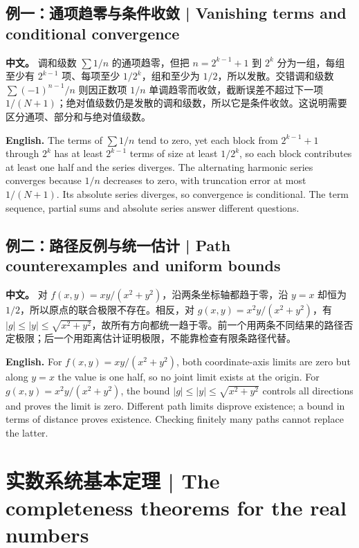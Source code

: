 \documentclass[UTF8,11pt,a4paper]{ctexart}
\newcommand{\APS}[2]{\par\noindent\textbf{中文。} #1\par\noindent\textbf{English.} #2\par\smallskip}
\begin{document}
\subsection*{例一：通项趋零与条件收敛 | Vanishing terms and conditional convergence}
\APS{调和级数 $\sum 1/n$ 的通项趋零，但把 $n=2^{k-1}+1$ 到 $2^k$ 分为一组，每组至少有 $2^{k-1}$ 项、每项至少 $1/2^k$，组和至少为 $1/2$，所以发散。交错调和级数 $\sum(-1)^{n-1}/n$ 则因正数项 $1/n$ 单调趋零而收敛，截断误差不超过下一项 $1/(N+1)$；绝对值级数仍是发散的调和级数，所以它是条件收敛。这说明需要区分通项、部分和与绝对值级数。}{The terms of $\sum1/n$ tend to zero, yet each block from $2^{k-1}+1$ through $2^k$ has at least $2^{k-1}$ terms of size at least $1/2^k$, so each block contributes at least one half and the series diverges. The alternating harmonic series converges because $1/n$ decreases to zero, with truncation error at most $1/(N+1)$. Its absolute series diverges, so convergence is conditional. The term sequence, partial sums and absolute series answer different questions.}
\subsection*{例二：路径反例与统一估计 | Path counterexamples and uniform bounds}
\APS{对 $f(x,y)=xy/(x^2+y^2)$，沿两条坐标轴都趋于零，沿 $y=x$ 却恒为 $1/2$，所以原点的联合极限不存在。相反，对 $g(x,y)=x^2y/(x^2+y^2)$，有 $|g|\le |y|\le\sqrt{x^2+y^2}$，故所有方向都统一趋于零。前一个用两条不同结果的路径否定极限；后一个用距离估计证明极限，不能靠检查有限条路径代替。}{For $f(x,y)=xy/(x^2+y^2)$, both coordinate-axis limits are zero but along $y=x$ the value is one half, so no joint limit exists at the origin. For $g(x,y)=x^2y/(x^2+y^2)$, the bound $|g|\le |y|\le\sqrt{x^2+y^2}$ controls all directions and proves the limit is zero. Different path limits disprove existence; a bound in terms of distance proves existence. Checking finitely many paths cannot replace the latter.}

\setcounter{section}{1}
\section{实数系统基本定理 | The completeness theorems for the real numbers}
\end{document}
